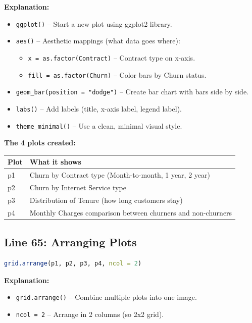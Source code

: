 \documentclass[12pt,a4paper]{article}
\begin{document}
\textbf{Explanation:}
\begin{itemize}
    \item \texttt{ggplot()} -- Start a new plot using ggplot2 library.
    \item \texttt{aes()} -- Aesthetic mappings (what data goes where):
    \begin{itemize}
        \item \texttt{x = as.factor(Contract)} -- Contract type on x-axis.
        \item \texttt{fill = as.factor(Churn)} -- Color bars by Churn status.
    \end{itemize}
    \item \texttt{geom\_bar(position = "dodge")} -- Create bar chart with bars side by side.
    \item \texttt{labs()} -- Add labels (title, x-axis label, legend label).
    \item \texttt{theme\_minimal()} -- Use a clean, minimal visual style.
\end{itemize}

\textbf{The 4 plots created:}

\begin{table}[h]
\centering
\begin{tabular}{@{}ll@{}}
\toprule
\textbf{Plot} & \textbf{What it shows} \\ \midrule
p1 & Churn by Contract type (Month-to-month, 1 year, 2 year) \\
p2 & Churn by Internet Service type \\
p3 & Distribution of Tenure (how long customers stay) \\
p4 & Monthly Charges comparison between churners and non-churners \\ \bottomrule
\end{tabular}
\end{table}

\subsection{Line 65: Arranging Plots}

\begin{lstlisting}[language=R]
grid.arrange(p1, p2, p3, p4, ncol = 2)
\end{lstlisting}

\textbf{Explanation:}
\begin{itemize}
    \item \texttt{grid.arrange()} -- Combine multiple plots into one image.
    \item \texttt{ncol = 2} -- Arrange in 2 columns (so 2x2 grid).
\end{itemize}
\end{document}
